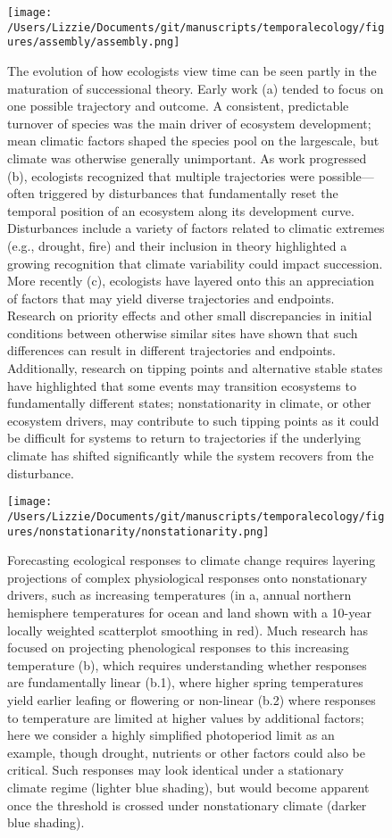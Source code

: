 \documentclass[11pt,a4paper,oneside]{article}
\begin{document}
\newpage
\begin{figure}[h!]
\centering
\noindent \texttt{[image: /Users/Lizzie/Documents/git/manuscripts/temporalecology/figures/assembly/assembly.png]}
\caption{The evolution of how ecologists view time can be seen partly in the maturation of successional theory. Early work (a) tended to focus on one possible trajectory and outcome. A consistent, predictable turnover of species was the main driver of ecosystem development; mean climatic factors shaped the species pool on the largescale, but climate was otherwise generally unimportant. As work progressed (b), ecologists recognized that multiple trajectories were possible---often triggered by disturbances that fundamentally reset the temporal position of an ecosystem along its development curve. Disturbances include a variety of factors related to climatic extremes (e.g., drought, fire) and their inclusion in theory highlighted a growing recognition that climate variability could impact succession. More recently (c), ecologists have layered onto this an appreciation of factors that may yield diverse trajectories and endpoints. Research on priority effects and other small discrepancies in initial conditions between otherwise similar sites have shown that such differences can result in different trajectories and endpoints. Additionally, research on tipping points and alternative stable states have highlighted that some events may transition ecosystems to fundamentally different states; nonstationarity in climate, or other ecosystem drivers, may contribute to such tipping points as it could be difficult for systems to return to trajectories if the underlying climate has shifted significantly while the system recovers from the disturbance.}
\end{figure}

\newpage
\begin{figure}[h!]
\centering
\noindent \texttt{[image: /Users/Lizzie/Documents/git/manuscripts/temporalecology/figures/nonstationarity/nonstationarity.png]}
\caption{Forecasting ecological responses to climate change requires layering projections of complex physiological responses onto nonstationary drivers, such as increasing temperatures (in a, annual northern hemisphere temperatures for ocean and land shown with a 10-year locally weighted scatterplot smoothing in red). Much research has focused on projecting phenological responses to this increasing temperature (b), which requires understanding whether responses are fundamentally linear (b.1), where higher spring temperatures yield earlier leafing or flowering or non-linear (b.2) where responses to temperature are limited at higher values by additional factors; here we consider a highly simplified photoperiod limit as an example, though drought, nutrients or other factors could also be critical. Such responses may look identical under a stationary climate regime (lighter blue shading), but would become apparent once the threshold is crossed under nonstationary climate (darker blue shading).}
\end{figure}
\end{document}
